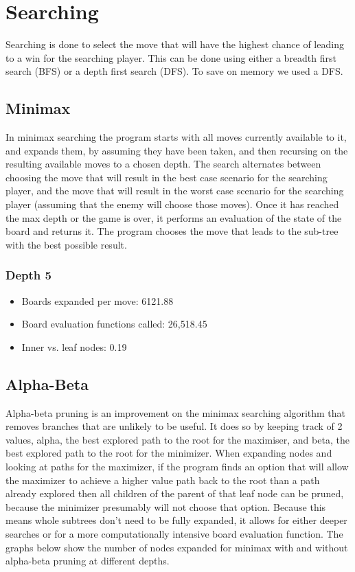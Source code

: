 \documentclass{article}
\begin{document}
\section{Searching}

Searching is done to select the move that will have the highest chance of
leading to a win for the searching player.  This can be done using either a
breadth first search (BFS) or a depth first search (DFS). To save on memory
we used a DFS.

\subsection{Minimax}

In minimax searching the program starts with all moves currently available to
it, and expands them, by assuming they have been taken, and then recursing on
the resulting available moves to a chosen depth. The search alternates between
choosing the move that will result in the best case scenario for the searching
player, and the move that will result in the worst case scenario for the
searching player (assuming that the enemy will choose those moves). Once it has
reached the max depth or the game is over, it performs an evaluation of the
state of the board and returns it. The program chooses the move that leads to
the sub-tree with the best possible result.

\subsubsection{Depth 5}
\begin{itemize}
	\item Boards expanded per move: 6121.88
	\item Board evaluation functions called: 26,518.45
	\item Inner vs. leaf nodes: 0.19
\end{itemize}

\subsection{Alpha-Beta}

Alpha-beta pruning is an improvement on the minimax searching algorithm that
removes branches that are unlikely to be useful. It does so by keeping track of
2 values, alpha, the best explored path to the root for the maximiser, and
beta, the best explored path to the root for the minimizer. When expanding
nodes and looking at paths for the maximizer, if the program finds an option
that will allow the maximizer to achieve a higher value path back to the root
than a path already explored then all children of the parent of that leaf node
can be pruned, because the minimizer presumably will not choose that option.
Because this means whole subtrees don’t need to be fully expanded, it allows
for either deeper searches  or for a more computationally intensive board
evaluation function. The graphs below show the number of nodes expanded for
minimax with and without alpha-beta pruning at different depths.
\end{document}
